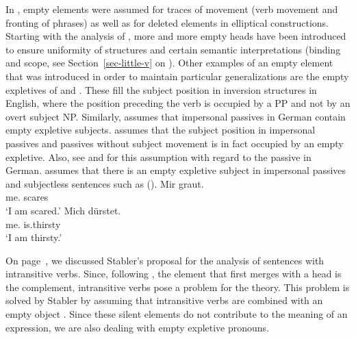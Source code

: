 In \gbt, empty elements were assumed for traces of movement (verb movement and fronting of phrases)
as well as for deleted elements in elliptical constructions. Starting with the analysis
of \citet{Larson88a}, more and more empty heads have been introduced to ensure
uniformity of structures and certain semantic interpretations (binding and scope, see Section~\ref{sec-little-v} on \littlev). Other examples of an
empty element that was introduced in order to maintain particular generalizations are the empty
expletives of \citet[]{Coopmans-89a-u} and
\citet[Chapter~1]{Postal2004a-u}. These fill the subject position in inversion
structures in English, where the position preceding the verb is occupied by a PP and not
by an overt subject NP. 
Similarly, \citet[Section~4]{Safir85a-u} assumes that impersonal passives in German contain empty
expletive subjects. \citet[]{Grewendorf93} assumes that the subject
position in impersonal passives and passives without subject movement is in
fact occupied by an empty expletive. Also, see  and \citet[]{Lohnstein2014a} for this assumption with regard to the passive in
German. \citet[Section~II.3.3.3]{Sternefeld2006a-u} assumes that there is an empty expletive subject
in impersonal passives and subjectless sentences such as ().
\eal
\ex 
\gll Mir graut.\\
	 me.\dat{} scares\\
\glt `I am scared.'
\ex 
\gll Mich dürstet.\\
	 me.\acc{} is.thirsty\\
\glt `I am thirsty.'
\zl

\noindent
On page~\pageref{Beispiel-leeres-Element-intransitive-Verben}, we discussed Stabler's proposal for the analysis of sentences with intransitive
verbs. Since, following  \citet[]{Chomsky2008a}, the element that first merges with a head is the complement, intransitive verbs pose a problem for the
theory. This problem is solved by Stabler by assuming that intransitive verbs are combined with an empty object \citep[,
124]{Veenstra98a}. Since these silent elements do not contribute to the meaning of an expression, we are also dealing with empty expletive pronouns.

